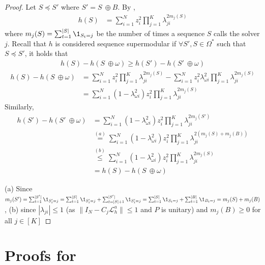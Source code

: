 \documentclass{article}
\begin{document}
\begin{proof}

Let $S \preceq S'$ where $S' = S \ \oplus B$. By ,
\begin{align*}
    h(S) &= \sum_{i = 1}^N z_i^2 \prod_{j = 1}^K \lambda_{ji}^{2m_j(S)} 
\end{align*}
where $m_j(S) = \sum_{t = 1}^{|S|} \1_{S_t = j}$ be the number of times a sequence $S$ calls the solver $j$. Recall that $h$ is considered sequence supermodular if $\forall S', S \in \Omega^*$ such that $S \preceq S'$, it holds that
\begin{align*}
    h(S) - h(S \ \oplus \omega ) \geq h(S') - h(S' \ \oplus \omega )
\end{align*}
\begin{align*}
    h(S) - h(S \ \oplus \omega) &= \sum_{i = 1}^N z_i^2 \prod_{j = 1}^K \lambda_{ji}^{2m_j(S)} - \sum_{i = 1}^N z_i^2 \lambda_{\omega i}^{2}\prod_{j = 1}^K \lambda_{ji}^{2m_j(S)} \\
    &=  \sum_{i = 1}^N \left(1 - \lambda_{\omega i}^2\right) z_i^2 \prod_{j = 1}^K \lambda_{ji}^{2m_j(S)}
\end{align*}
Similarly, 
\begin{align*}
    h(S') - h(S' \ \oplus \omega) &= \sum_{i = 1}^N \left(1 - \lambda_{\omega i}^2\right) z_i^2 \prod_{j = 1}^K \lambda_{ji}^{2m_j(S')} \\
    &\overset{(a)}{=}  \sum_{i = 1}^N \left(1 - \lambda_{\omega i}^2\right) z_i^2 \prod_{j = 1}^K \lambda_{ji}^{2\left(m_j(S) + m_j(B)\right)} \\
    &\overset{(b)}{\leq } \sum_{i = 1}^N \left(1 - \lambda_{\omega i}^2\right) z_i^2 \prod_{j = 1}^K \lambda_{ji}^{2m_j(S)} \\
    &= h(S) - h(S \ \oplus \omega)
\end{align*}


(a) Since $m_j(S') = \sum_{t = 1}^{|S'|} \1_{S_t' = j} = \sum_{t = 1}^{|S|} \1_{S_t' = j} + \sum_{t = |S| + 1}^{|S'|} \1_{S_t' = j} = \sum_{t = 1}^{|S|} \1_{S_t = j} + \sum_{t = 1}^{|B|} \1_{B_t = j} = m_j(S) + m_j(B)$, (b) since $|\lambda_{ji}| \leq 1$ (as $\|I_N - C_j\mathcal{L}_h^a\| \le 1$ and $P$ is unitary) and $m_j(B) \geq 0$ for all $j \in [K]$

\end{proof}


\section{Proofs for } \label{sec:proofapproxgreedy}
\end{document}
